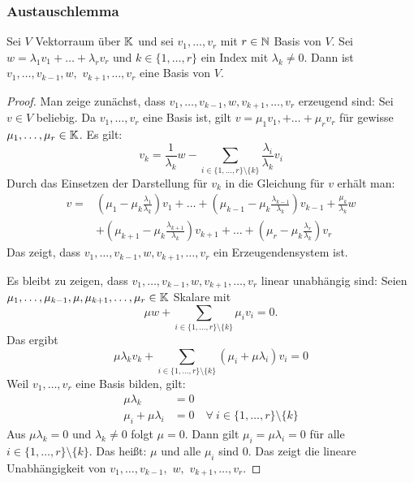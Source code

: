 \subsubsection{Austauschlemma}

\begin{lm}
	Sei $ V $ Vektorraum über $ \mathbb K $ und sei $ v_1, \ldots, v_r $ mit $ r \in \mathbb N $ Basis von $ V $. Sei $ w = \lambda_1v_1 + \ldots + \lambda_rv_r $ und $ k \in \{ 1, \ldots, r \} $ ein Index mit $ \lambda_k \neq 0 $. Dann ist $ v_1, \ldots, v_{k-1}, w, $ $ v_{k+1}, \ldots, v_r $ eine Basis von $ V $.
\end{lm}
\begin{proof}
	Man zeige zunächst, dass $ v_1, \ldots, v_{k-1}, w, v_{k+1}, \ldots, v_r $ erzeugend sind: Sei $ v \in V $ beliebig. Da $ v_1, \ldots, v_r $ eine Basis ist, gilt $ v = \mu_1v_1, + \ldots + \mu_rv_r $ für gewisse $ \mu_1, \ldots, \mu_r \in \mathbb K $. Es gilt:
	\begin{equation*}
		v_k = \frac{1}{\lambda_k}w - \sum_{i \in \{ 1, \ldots, r \} \setminus \{ k \}}\frac{\lambda_i}{\lambda_k}v_i
	\end{equation*}
	Durch das Einsetzen der Darstellung für $ v_k $ in die Gleichung für $ v $ erhält man:
	\begin{align*}
		v = &\left( \mu_1 - \mu_k \frac{\lambda_1}{\lambda_k} \right)v_1 + \ldots + \left( \mu_{k-1} - \mu_k \frac{\lambda_{k-1}}{\lambda_k} \right)v_{k-1} + \frac{\mu_k}{\lambda_k}w \\
		&+ \left( \mu_{k+1} - \mu_k \frac{\lambda_{k+1}}{\lambda_k} \right)v_{k+1} + \ldots + \left( \mu_r - \mu_k \frac{\lambda_r}{\lambda_k} \right)v_r
	\end{align*}
	Das zeigt, dass $ v_1, \ldots, v_{k-1}, w, v_{k+1}, \ldots, v_r $ ein Erzeugendensystem ist.
	
	Es bleibt zu zeigen, dass $ v_1, \ldots, v_{k-1}, w, v_{k+1}, \ldots, v_r $ linear unabhängig sind: Seien $ \mu_1, \ldots, \mu_{k-1}, \mu, \mu_{k+1}, \ldots, \mu_r \in \mathbb K $ Skalare mit
	\begin{equation*}
		\mu w + \sum_{i \in \{ 1, \ldots, r \} \setminus \{ k \}} \mu_iv_i = 0.
	\end{equation*}
	Das ergibt
	\begin{equation*}
		\mu\lambda_kv_k + \sum_{i \in \{ 1, \ldots, r \} \setminus \{ k \}}(\mu_i + \mu\lambda_i)v_i = 0
	\end{equation*}
	Weil $ v_1, \ldots, v_r $ eine Basis bilden, gilt:
	\begin{align*}
		\mu\lambda_k &= 0\\
		\mu_i + \mu\lambda_i &= 0 \quad \forall\: i \in \{ 1, \ldots, r \} \setminus \{ k \}
	\end{align*}
	Aus $ \mu\lambda_k = 0 $ und $ \lambda_k \neq 0 $ folgt $ \mu = 0 $. Dann gilt $ \mu_i = \mu\lambda_i = 0 $ für alle $ i \in \{ 1, \ldots, r \} \setminus \{ k \} $. Das heißt: $ \mu $ und alle $ \mu_i $ sind 0. Das zeigt die lineare Unabhängigkeit von $ v_1, \ldots, v_{k-1}, $ $ w, $ $ v_{k+1}, \ldots, v_r $.
\end{proof}

